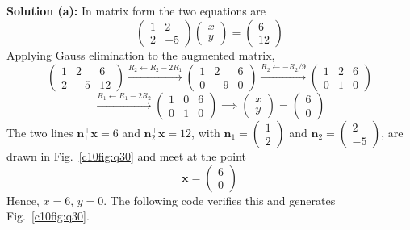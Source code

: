 \textbf{Solution (a):} In matrix form the two equations are
\begin{equation}
\begin{pmatrix} 1 & 2 \\ 2 & -5 \end{pmatrix}\begin{pmatrix} x \\ y \end{pmatrix} = \begin{pmatrix} 6 \\ 12 \end{pmatrix}
\end{equation}
Applying Gauss elimination to the augmented matrix,
\begin{equation}
\left(\begin{array}{cc|c} 1 & 2 & 6 \\ 2 & -5 & 12 \end{array}\right)
\xrightarrow{R_2 \leftarrow R_2 - 2R_1}
\left(\begin{array}{cc|c} 1 & 2 & 6 \\ 0 & -9 & 0 \end{array}\right)
\xrightarrow{R_2 \leftarrow -R_2/9}
\left(\begin{array}{cc|c} 1 & 2 & 6 \\ 0 & 1 & 0 \end{array}\right)
\end{equation}
\begin{equation}
\xrightarrow{R_1 \leftarrow R_1 - 2R_2}
\left(\begin{array}{cc|c} 1 & 0 & 6 \\ 0 & 1 & 0 \end{array}\right)
\implies \begin{pmatrix} x \\ y \end{pmatrix} = \begin{pmatrix} 6 \\ 0 \end{pmatrix}
\end{equation}
The two lines $\mathbf{n}_1^{\top}\mathbf{x} = 6$ and $\mathbf{n}_2^{\top}\mathbf{x} = 12$, with $\mathbf{n}_1 = \begin{pmatrix} 1 \\ 2 \end{pmatrix}$ and $\mathbf{n}_2 = \begin{pmatrix} 2 \\ -5 \end{pmatrix}$, are drawn in Fig.~\ref{c10fig:q30} and meet at the point
\begin{equation}
\mathbf{x} = \begin{pmatrix} 6 \\ 0 \end{pmatrix}
\end{equation}
Hence, $x = 6$, $y = 0$. The following code verifies this and generates Fig.~\ref{c10fig:q30}.

